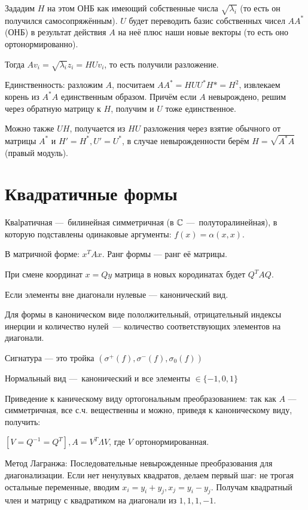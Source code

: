 \documentclass[12pt, a4paper]{article}
\begin{document}
Зададим $H$ на этом ОНБ как имеющий собственные числа $\sqrt{\lambda_i}$ (то есть он получился самосопряжённым). 
$U$ будет переводить базис собственных чисел $AA^*$ (ОНБ) в результат действия $A$ на неё плюс наши новые векторы (то есть оно ортонормированно).

Тогда $A v_i = \sqrt{\lambda_i} z_i = HU v_i$, то есть получили разложение.

Единственность: разложим $A$, посчитаем $AA^* = HUU^*H* = H^2$, извлекаем корень из $A^*A$ единственным образом.
Причём если $A$ невырождено, решим через обратную матрицу к $H$, получим и $U$ тоже единственное.


Можно также $UH$, получается из $HU$ разложения через взятие обычного от матрицы $A^*$ и $H' = H^*, U' = U^*$, 
в случае невырожденности берём $H = \sqrt{A^* A}$ (правый модуль).




\section{Квадратичные формы}

Кваlратичная — билинейная симметричная (в ${\mathbb{C}}$ — полуторалинейная), в которую подставлены одинаковые аргументы: $f(x) = \alpha (x, x)$.

В матричной форме: $x^T A x$.
Ранг формы — ранг её матрицы.

При смене координат $x = Q y$ матрица в новых кородинатах будет $Q^T A Q$.

Если элементы вне диагонали нулевые — канонический вид.

Для формы в каноническом виде пололжительный, отрицательный индексы инерции и количество нулей — количество соответствующих элементов на диагонали.

Сигнатура — это тройка $(\sigma^+(f), \sigma^-(f), \sigma_0(f))$

Нормальный вид — канонический и все элементы $\in \{-1, 0, 1\}$

Приведение к каническому виду ортогональным преобразованием: так как $A$ — симметричная, все с.ч. вещественны и можно, приведя к каноническому виду, получить:

$[V = Q^{-1} = Q^T], A = V^T \Lambda V$, где $V$ ортонормированная.

Метод Лагранжа: Последовательные невырожденные преобразования для диагонализации. 
Если нет ненулувых квадратов, делаем первый шаг:
не трогая остальные переменные, вводим $x_i = y_i + y_j, x_j = y_i - y_j$. 
Получам квадратный член и матрицу с квадратиком на диагонали из $1, 1, 1, -1$.
\end{document}
